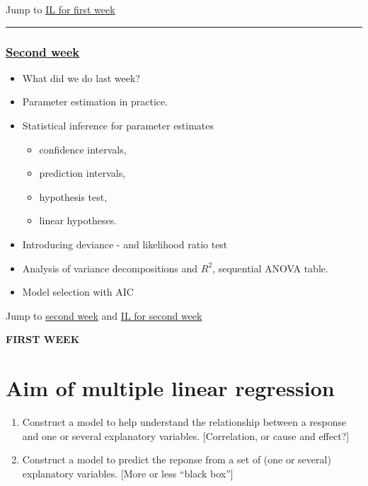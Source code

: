 \documentclass[
]{article}
\providecommand{\tightlist}{%
  \setlength{\itemsep}{0pt}\setlength{\parskip}{0pt}}
\begin{document}
Jump to \protect\hyperlink{interactivew1}{IL for first week}

\begin{center}\rule{0.5\linewidth}{0.5pt}\end{center}

\hypertarget{second-week}{%
\subsubsection{\texorpdfstring{\protect\hyperlink{secondweek}{Second
week}}{Second week}}\label{second-week}}

\begin{itemize}
\tightlist
\item
  What did we do last week?
\item
  Parameter estimation in practice.
\item
  Statistical inference for parameter estimates

  \begin{itemize}
  \tightlist
  \item
    confidence intervals,
  \item
    prediction intervals,
  \item
    hypothesis test,
  \item
    linear hypotheses.
  \end{itemize}
\item
  Introducing deviance - and likelihood ratio test
\item
  Analysis of variance decompositions and \(R^2\), sequential ANOVA
  table.
\item
  Model selection with AIC
\end{itemize}

Jump to \protect\hyperlink{secondweek}{second week} and
\protect\hyperlink{interactivew2}{IL for second week}

\textbf{FIRST WEEK}

\hypertarget{aim-of-multiple-linear-regression}{%
\section{Aim of multiple linear
regression}\label{aim-of-multiple-linear-regression}}

\begin{enumerate}
\def\labelenumi{\arabic{enumi}.}
\item
  Construct a model to help understand the relationship between a
  response and one or several explanatory variables. {[}Correlation, or
  cause and effect?{]}
\item
  Construct a model to predict the reponse from a set of (one or
  several) explanatory variables. {[}More or less ``black box''{]}
\end{enumerate}
\end{document}
